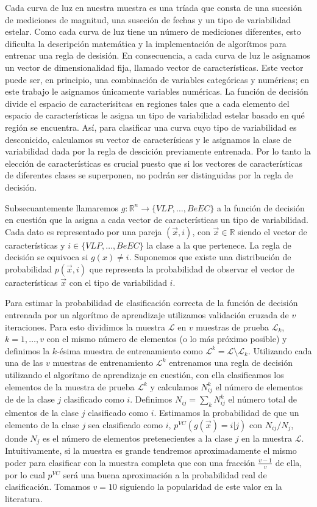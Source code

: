 \documentclass[letterpaper,12pt]{book}
\begin{document}
Cada curva de luz en nuestra muestra es una tríada que consta de una sucesión de mediciones de magnitud, una suseción de fechas y un tipo de variabilidad estelar. Como cada curva de luz tiene un número de mediciones diferentes, esto dificulta la descripción matemática y la implementación de algorítmos para entrenar una regla de desisión. En consecuencia, a cada curva de luz le asignamos un vector de dimensionalidad fija, llamado vector de características. Este vector puede ser, en principio, una combinación de variables categóricas y numéricas; en este trabajo le asignamos únicamente variables numéricas. La función de decisión divide el espacio de caracterísitcas en regiones tales que a cada elemento del espacio de características le asigna un tipo de variabilidad estelar basado en qué región se encuentra. Así, para clasificar una curva cuyo tipo de variabilidad es desconicido, calculamos su vector de caracterísicas y le asignamos la clase de variabilidad dada por la regla de descición previamente entrenada. Por lo tanto la elección de características es crucial puesto que si los vectores de características de diferentes clases se superponen, no podrán ser distinguidas por la regla de decisión.

Subsecuantemente llamaremos $g:\mathbb{R}^{n}\rightarrow \{VLP,\dots, BeEC\}$ a la función de decisión en cuestión que la asigna a cada vector de características un tipo de variabilidad. Cada dato es representado por una pareja $(\vec{x}, i)$, con $\vec{x}\in\mathbb{R}$ siendo el vector de características y $i\in\{VLP,\dots, BeEC\}$ la clase a la que pertenece. La regla de decisión se equivoca si  $g(x)\neq i$. Suponemos que existe una distribución de probabilidad $p(\vec{x},i)$ que representa la probabilidad de observar el vector de características $\vec{x}$ con el tipo de variabilidad $i$.

Para estimar la probabilidad de clasificación correcta de la función de decisión entrenada por un algorítmo de aprendizaje utilizamos validación cruzada de $v$ iteraciones. Para esto dividimos la muestra $\mathcal{L}$ en $v$ muestras de prueba $\mathcal{L}_{k}$, $k=1,\dots,v$ con el mismo número de elementos (o lo más próximo posible) y definimos la $k$-ésima muestra de entrenamiento como $\mathcal{L}^{k} = \mathcal{L}\setminus \mathcal{L}_{k}$. Utilizando cada una de las $v$ muestras de entrenamiento $\mathcal{L}^{k}$  entrenamos una regla de decisión utilizando el algorítmo de aprendizaje en cuestión, con ella clasificamos los elementos de la muestra de prueba $\mathcal{L}^{k}$ y calculamos $N_{ij}^{k}$ el número de elementos de de la clase $j$ clasificado como $i$. Definimos $N_{ij}=\sum_{k}N_{ij}^{k}$ el número total de elmentos de la clase $j$ clasificado como $i$. Estimamos la probabilidad de que un elemento de la clase $j$ sea clasificado como $i$, $p^{VC}(g(\vec{x})=i|j)$ con $N_{ij}/N_{j}$, donde $N_{j}$ es el número de elementos pretenecientes a la clase $j$ en la muestra $\mathcal{L}$. Intuitivamente, si la muestra es grande tendremos aproximadamente el mismo poder para clasificar con la muestra completa que con una fracción $\frac{v-1}{v}$ de ella, por lo cual $p^{VC}$ será una buena aproximación a la probabilidad real de clasificación. Tomamos $v=10$ siguiendo la popularidad de este valor en la literatura. 
\end{document}

